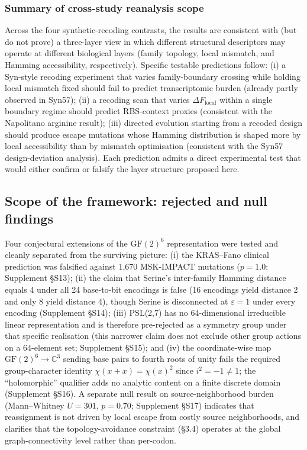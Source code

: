 \documentclass[preprint,11pt,authoryear,a4paper]{elsarticle}
\begin{document}
\subsubsection{Summary of cross-study reanalysis scope}

Across the four synthetic-recoding contrasts, the results are consistent
with (but do not prove) a three-layer view in which different structural
descriptors may operate at different biological layers (family topology,
local mismatch, and Hamming accessibility, respectively). Specific
testable predictions follow: (i) a Syn-style recoding experiment that
varies family-boundary crossing while holding local mismatch fixed
should fail to predict transcriptomic burden (already partly observed in
Syn57); (ii) a recoding scan that varies \(\Delta F_{\text{local}}\)
within a single boundary regime should predict RBS-context proxies
(consistent with the Napolitano arginine result); (iii) directed
evolution starting from a recoded design should produce escape mutations
whose Hamming distribution is shaped more by local accessibility than by
mismatch optimisation (consistent with the Syn57 design-deviation
analysis). Each prediction admits a direct experimental test that would
either confirm or falsify the layer structure proposed here.

\subsection{Scope of the framework: rejected and null
findings}\label{sec:res-negatives}

Four conjectural extensions of the \({\text{GF}(2)}^{6}\) representation
were tested and cleanly separated from the surviving picture: (i) the
KRAS--Fano clinical prediction was falsified against 1,670 MSK-IMPACT
\citep{zehir2017} mutations (\(p = 1.0\); Supplement §S13); (ii) the
claim that Serine's inter-family Hamming distance equals 4 under all 24
base-to-bit encodings is false (16 encodings yield distance 2 and only 8
yield distance 4), though Serine is disconnected at \(\varepsilon = 1\)
under every encoding (Supplement §S14); (iii) PSL(2,7) has no
64-dimensional irreducible linear representation and is therefore
pre-rejected as a symmetry group under that specific realisation
\citep{antoneli2011} (this narrower claim does not exclude other group
actions on a 64-element set; Supplement §S15); and (iv) the
coordinate-wise map \({\text{GF}(2)}^{6} \rightarrow {\mathbb{C}}^{3}\)
sending base pairs to fourth roots of unity fails the required
group-character identity \(\chi(x + x) = {\chi(x)}^{2}\) since
\(i^{2} = - 1 \neq 1\); the ``holomorphic'' qualifier adds no analytic
content on a finite discrete domain (Supplement §S16). A separate null
result on source-neighborhood burden (Mann--Whitney \(U = 301\),
\(p = 0.70\); Supplement §S17) indicates that reassignment is not driven
by local escape from costly source neighborhoods, and clarifies that the
topology-avoidance constraint (§3.4) operates at the global
graph-connectivity level rather than per-codon.
\end{document}

